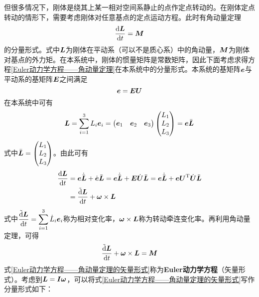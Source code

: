 但很多情况下，刚体是绕其上某一相对空间系静止的点作定点转动的。在刚体定点转动的情形下，需要考虑刚体对任意基点的定点运动方程。此时有角动量定理
\begin{equation}
	\frac{\mathrm{d} \boldsymbol{L}}{\mathrm{d} t} = \boldsymbol{M}
	\label{Euler动力学方程——角动量定理}
\end{equation}
的分量形式。式中$\boldsymbol{L}$为刚体在平动系（可以不是质心系）中的角动量，$\boldsymbol{M}$为刚体对基点的外力矩。在本系统中，刚体的惯量矩阵是常数矩阵，因此下面考虑求得方程\eqref{Euler动力学方程——角动量定理}在本系统中的分量形式。本系统的基矩阵$\boldsymbol{e}$与平动系的基矩阵$\boldsymbol{E}$之间满足
\begin{equation*}
	\boldsymbol{e} = \boldsymbol{E} \boldsymbol{U}
\end{equation*}
在本系统中可有
\begin{equation*}
	\boldsymbol{L} = \sum_{i=1}^3 L_i \boldsymbol{e}_i = \begin{pmatrix} \boldsymbol{e}_1 & \boldsymbol{e}_2 & \boldsymbol{e}_3 \end{pmatrix} \begin{pmatrix} L_1 \\ L_2 \\ L_3 \end{pmatrix} = \boldsymbol{e} \bar{\boldsymbol{L}}
\end{equation*}
式中$\bar{\boldsymbol{L}} = \begin{pmatrix} L_1 \\ L_2 \\ L_3 \end{pmatrix}$。由此可有
\begin{align}
	\frac{\mathrm{d} \boldsymbol{L}}{\mathrm{d} t} & = \boldsymbol{e} \dot{\bar{\boldsymbol{L}}} + \dot{\boldsymbol{e}} \bar{\boldsymbol{L}} = \boldsymbol{e} \dot{\bar{\boldsymbol{L}}} + \boldsymbol{E} \dot{\boldsymbol{U}} \bar{\boldsymbol{L}} = \boldsymbol{e} \dot{\bar{\boldsymbol{L}}} + \boldsymbol{e} \boldsymbol{U}^{\mathrm{T}} \dot{\boldsymbol{U}} \bar{\boldsymbol{L}} \nonumber \\
	& = \frac{\tilde{\mathrm{d}} \boldsymbol{L}}{\mathrm{d} t} + \boldsymbol{\omega} \times \boldsymbol{L}
\end{align}
式中$\displaystyle \frac{\tilde{\mathrm{d}} \boldsymbol{L}}{\mathrm{d} t} = \sum_{i=1}^3 \dot{L}_i \boldsymbol{e}_i$称为{\heiti 相对变化率}，$\boldsymbol{\omega} \times \boldsymbol{L}$称为{\heiti 转动牵连变化率}。再利用角动量定理，可得
\begin{equation}
	\frac{\tilde{\mathrm{d}} \boldsymbol{L}}{\mathrm{d} t} + \boldsymbol{\omega} \times \boldsymbol{L} = \boldsymbol{M}
	\label{Euler动力学方程——角动量定理的矢量形式}
\end{equation}
式\eqref{Euler动力学方程——角动量定理的矢量形式}称为{\bf Euler动力学方程}（矢量形式）。考虑到$\boldsymbol{L} = \boldsymbol{I} \boldsymbol{\omega}$，可以将式\eqref{Euler动力学方程——角动量定理的矢量形式}写作分量形式如下：
